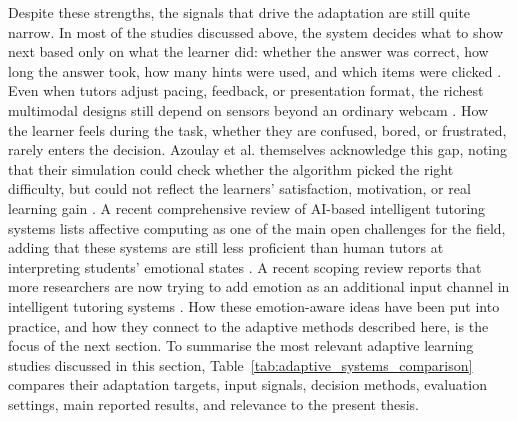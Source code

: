Despite these strengths, the signals that drive the adaptation are still quite narrow. In most of the studies discussed above, the system decides what to show next based only on what the learner did: whether the answer was correct, how long the answer took, how many hints were used, and which items were clicked \cite{azoulay_adaptive_2021,fu_integrating_2025,kuling_ken_2025}. Even when tutors adjust pacing, feedback, or presentation format, the richest multimodal designs still depend on sensors beyond an ordinary webcam \cite{govea_implementation_2024,kong_real-time_2025,gong_design_2025}. How the learner feels during the task, whether they are confused, bored, or frustrated, rarely enters the decision. Azoulay et al. themselves acknowledge this gap, noting that their simulation could check whether the algorithm picked the right difficulty, but could not reflect the learners' satisfaction, motivation, or real learning gain \cite{azoulay_adaptive_2021}. A recent comprehensive review of AI-based intelligent tutoring systems lists affective computing as one of the main open challenges for the field, adding that these systems are still less proficient than human tutors at interpreting students' emotional states \cite{zerkouk_comprehensive_2025}. A recent scoping review reports that more researchers are now trying to add emotion as an additional input channel in intelligent tutoring systems \cite{fernandez-herrero_evaluating_2024}. How these emotion-aware ideas have been put into practice, and how they connect to the adaptive methods described here, is the focus of the next section. To summarise the most relevant adaptive learning studies discussed in this section, Table~\ref{tab:adaptive_systems_comparison} compares their adaptation targets, input signals, decision methods, evaluation settings, main reported results, and relevance to the present thesis.

